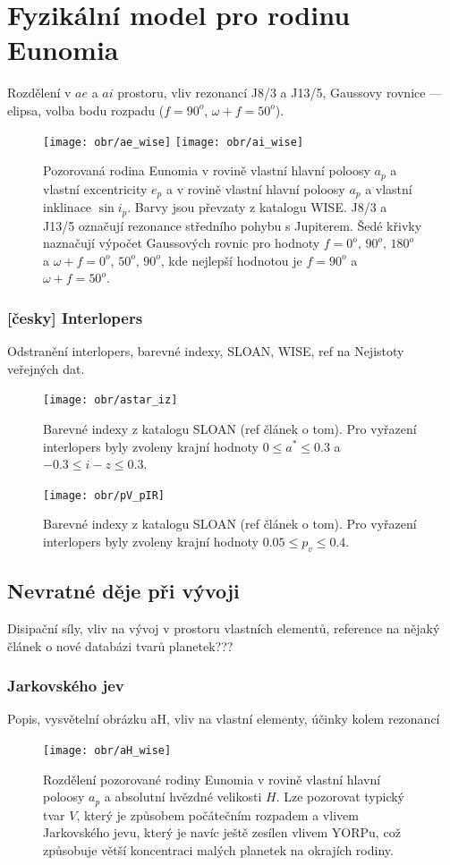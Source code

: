 \documentclass[A4paper, 12pt, oneside]{book}
\begin{document}
\section{Fyzikální model pro rodinu Eunomia}
Rozdělení v $ae$ a $ai$ prostoru, vliv rezonancí J8/3 a J13/5, Gaussovy rovnice --- elipsa, volba bodu rozpadu ($f=90^o$, $\omega+f=50^o$).
\begin{figure}[!htb]
	\centering
	\texttt{[image: obr/ae\_wise]}
	\texttt{[image: obr/ai\_wise]}
	\caption{Pozorovaná rodina Eunomia v rovině vlastní hlavní poloosy $a_p$ a vlastní excentricity $e_p$ a v rovině vlastní hlavní poloosy $a_p$ a vlastní inklinace $\sin i_p$. Barvy jsou převzaty z katalogu WISE. J8/3 a J13/5 označují rezonance středního pohybu s Jupiterem. Šedé křivky naznačují výpočet Gaussových rovnic pro hodnoty $f=0^o,\,90^o,\,180^o$ a $\omega+f=0^o,\, 50^o,\, 90^o$, kde nejlepší hodnotou je $f=90^o$ a $\omega+f=50^o$.}
	\label{ae_ai_wise}
\end{figure}
\subsubsection{[česky] Interlopers}
Odstranění interlopers, barevné indexy, SLOAN, WISE, ref na Nejistoty veřejných dat.
\begin{figure}[!htb]
	\centering
	\texttt{[image: obr/astar\_iz]}
	\caption{Barevné indexy z katalogu SLOAN (ref článek o tom). Pro vyřazení interlopers byly zvoleny krajní hodnoty $0\leq a^* \leq 0.3$ a $-0.3\leq i-z \leq 0.3$.}
	\label{astar_iz}
\end{figure}
\begin{figure}[!htb]
	\centering
	\texttt{[image: obr/pV\_pIR]}
	\caption{Barevné indexy z katalogu SLOAN (ref článek o tom). Pro vyřazení interlopers byly zvoleny krajní hodnoty $0.05 \leq p_v \leq 0.4$.}
	\label{pV_pIR}
\end{figure}
\subsection{Nevratné děje při vývoji}
Disipační síly, vliv na vývoj v prostoru vlastních elementů, reference na nějaký článek o nové databázi tvarů planetek???
\subsubsection{Jarkovského jev} \label{sec:jarko}
Popis, vysvětelní obrázku aH, vliv na vlastní elementy, účinky kolem rezonancí
\begin{figure}[!htb]
	\centering
	\texttt{[image: obr/aH\_wise]}
	\caption{Rozdělení pozorované rodiny Eunomia v rovině vlastní hlavní poloosy $a_p$ a absolutní hvězdné velikosti $H$. Lze pozorovat typický tvar $V$, který je způsobem počátečním rozpadem a vlivem Jarkovského jevu, který je navíc ještě zesílen vlivem YORPu, což způsobuje větší koncentraci malých planetek na okrajích rodiny.}
	\label{aH_wise}
\end{figure}
\end{document}
